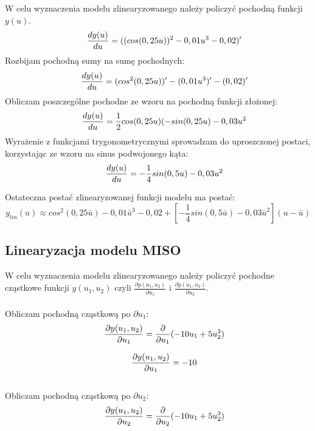 \documentclass[11pt,a4paper]{article}
\begin{document}
W celu wyznaczenia modelu zlinearyzowanego należy policzyć pochodną funkcji $y(u)$. 
\begin{eqnarray*}
\indent \frac{dy(u)}{du} = ((cos(0,25u))^2 - 0,01u^3 - 0,02)'
\end{eqnarray*}
Rozbijam pochodną sumy na sumę pochodnych: 
\begin{eqnarray*}
\indent \frac{dy(u)}{du} = (cos^2(0,25u))' - (0,01u^3)' - (0,02)' 
\end{eqnarray*}
Obliczam poszczególne pochodne ze wzoru na pochodną funkcji złożonej:
\begin{eqnarray*}
\indent \frac{dy(u)}{du} = \frac{1}{2}cos(0,25u)(-sin(0,25u) - 0,03u^2  
\end{eqnarray*}
Wyrażenie z funkcjami trygonometrycznymi sprowadzam do uproszczonej postaci, korzystając ze wzoru na sinus podwojonego kąta:
\begin{eqnarray*}
\indent \frac{dy(u)}{du} = -\frac{1}{4}sin(0,5u) - 0,03u^2  
\end{eqnarray*}

\indent Ostateczna postać zlinearyzowanej funkcji modelu ma postać:
\begin{equation}
y_{lin}(u) \approx cos^2(0,25\bar{u}) - 0,01\bar{u}^3 - 0,02 + [-\frac{1}{4}sin(0,5\bar{u}) - 0,03\bar{u}^2](u - \bar{u})
\label{eqn:wzor6}
\end{equation}

\subsection{Linearyzacja modelu MISO}
W celu wyznaczenia modelu zlinearyzowanego należy policzyć pochodne cząstkowe funkcji $y(u_{1}, u_{2})$ czyli $\frac{\partial y(u_{1}, u_{2})}{\partial{u_{1}}}$ i $\frac{\partial y(u_{1}, u_{2})}{\partial{u_{2}}}$.
\\ \\
Obliczam pochodną cząstkową po $\partial u_{1}$:
\begin{eqnarray*}
\indent \frac{\partial y(u_{1}, u_{2})}{\partial{u_{1}}} = \frac{\partial}{\partial u_{1}}(-10u_{1} + 5u_{2}^3)
\end{eqnarray*}

\begin{eqnarray*}
\indent \frac{\partial y(u_{1}, u_{2})}{\partial{u_{1}}} = -10
\end{eqnarray*}
\\
Obliczam pochodną cząstkową po $\partial u_{2}$:
\begin{eqnarray*}
\indent \frac{\partial y(u_{1}, u_{2})}{\partial{u_{2}}} = \frac{\partial}{\partial u_{2}}(-10u_{1} + 5u_{2}^3)
\end{eqnarray*}
\end{document}
